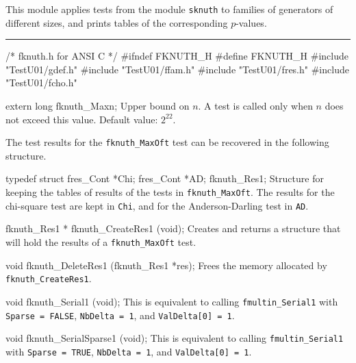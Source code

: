 
This module applies tests from the module {\tt sknuth}
to families of generators of different sizes, 
and prints tables of the corresponding $p$-values.


\bigskip
\hrule
\code\hide
/* fknuth.h for ANSI C */
#ifndef FKNUTH_H
#define FKNUTH_H
\endhide
#include "TestU01/gdef.h"
#include "TestU01/ffam.h"
#include "TestU01/fres.h"
#include "TestU01/fcho.h"


extern long fknuth_Maxn;
\endcode
\tab
  Upper bound on $n$.
  A test is called only when $n$ does not exceed this value.
  Default value: $2^{22}$.
\endtab
\ifdetailed  %



The test results for the {\tt fknuth\_MaxOft} test can be recovered
in the following structure.

\code

typedef struct {
   fres_Cont *Chi;
   fres_Cont *AD;
} fknuth_Res1;
\endcode
 \tab
  Structure for keeping the tables of results of the tests in
  {\tt fknuth\_MaxOft}. The results for the chi-square test are kept in
  {\tt Chi}, and for the Anderson-Darling test in  {\tt AD}.
 \endtab
\code


fknuth_Res1 * fknuth_CreateRes1 (void);
\endcode
 \tab 
  Creates and returns a structure that will hold the results
  of a  {\tt fknuth\_MaxOft} test. 
 \endtab
\code


void fknuth_DeleteRes1 (fknuth_Res1 *res);
\endcode
 \tab 
  Frees the memory allocated by {\tt fknuth\_CreateRes1}.
 \endtab

\fi    %


\code

void fknuth_Serial1 (void);
\endcode
\tab This is equivalent to calling 
 {\tt fmultin\_Serial1} with {\tt Sparse = FALSE}, 
  {\tt NbDelta = 1}, and {\tt Val\-Delta[0] = 1}.
 \endtab
\code


void fknuth_SerialSparse1 (void);
\endcode
\tab This is equivalent to calling {\tt fmultin\_Serial1} with 
  {\tt Sparse = TRUE},  {\tt NbDelta = 1}, and {\tt Val\-Delta[0] = 1}.
 \endtab
\code


